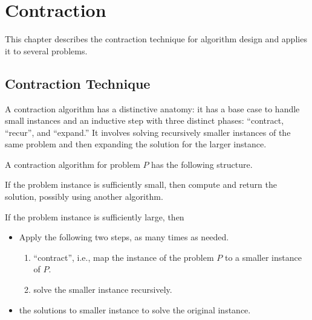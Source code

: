 \chapter{Contraction}
\label{ch:design::contraction}

\begin{preamble}
This chapter describes the contraction technique for algorithm design
and applies it to several problems.
%
\end{preamble}


\section{Contraction Technique}
\label{sec:design::contraction}

\begin{gram}
A contraction algorithm has a distinctive anatomy: it has a base case to handle small instances and an inductive step with three
distinct phases: ``contract, ``recur'', and ``expand.''
%
It  involves
solving recursively  smaller instances of the same problem and then expanding the solution for the larger instance.
%
\end{gram}

\begin{definition}[Contraction]
\label{def:design::contraction}

A contraction algorithm for problem $P$ has the following structure.
%

\begin{description}[topsep=1pt,itemsep=1pt]

\item[Base Case:] If the problem instance is sufficiently small, then
  compute and return the solution, possibly using another algorithm.

\item[Inductive Step(s):] If the problem instance is sufficiently large,
  then 


\begin{itemize}
\item 
Apply the following two steps, as many  times as needed.

\begin{enumerate}[topsep=1pt,itemsep=1pt]
\item {} 
``contract'', i.e., map the instance of the problem $P$ to a smaller
  instance of $P$.

\item {}
solve the smaller instance recursively.
\end{enumerate}

\item
{} the solutions to smaller instance to solve the original
instance.

\end{itemize}
\end{description}
%

\end{definition}

